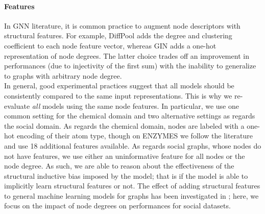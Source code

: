 \documentclass{article}
\begin{document}
\paragraph{Features} In GNN literature, it is common practice to augment node descriptors with structural features. For example, DiffPool adds the degree and clustering coefficient to each node feature vector, whereas GIN adds a one-hot representation of node degrees. The latter choice trades off an improvement in performances (due to injectivity of the first sum) with the inability to generalize to graphs with arbitrary node degree.\\
In general, good experimental practices suggest that all models should be consistently compared to the same input representations. This is why we re-evaluate \textit{all} models using the same node features. In particular, we use one common setting for the chemical domain and two alternative settings as regards the social domain. As regards the chemical domain, nodes are labeled with a one-hot encoding of their atom type, though on ENZYMES we follow the literature and use 18 additional features available. As regards social graphs, whose nodes do not have features, we use either an uninformative feature for all nodes or the node degree. As such, we are able to reason about the effectiveness of the structural inductive bias imposed by the model; that is if the model is able to implicitly learn structural features or not. The effect of adding structural features to general machine learning models for graphs has been investigated in \cite{label-independent-features}; here, we focus on the impact of node degrees on performances for social datasets. 
\end{document}
